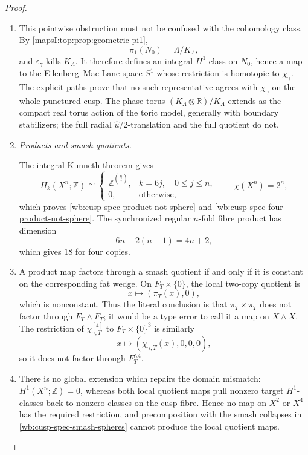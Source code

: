 \begin{proof}
\begin{enumerate}[label=\arabic*.,leftmargin=*]
\item This pointwise obstruction must not be confused with the cohomology class.
By \cref{mapsI:top:prop:geometric-pi1},
\[
 \pi_1(N_0)=\Lambda/K_\Lambda,
\]
and \(\varepsilon_\gamma\) kills \(K_\Lambda\).  It therefore defines an
integral \(H^1\)-class on \(N_0\), hence a map to the Eilenberg--Mac Lane
space \(S^1\) whose restriction is homotopic to \(\chi_\gamma\).  The
explicit paths prove that no such representative agrees with
\(\chi_\gamma\) on the whole punctured cusp.  The phase torus
\((K_\Lambda\otimes\mathbb R)/K_\Lambda\) extends as the compact real torus
action of the toric model, generally with boundary stabilizers; the full
radial \(\widehat u/2\)-translation and the full quotient do not.

\item \medskip\noindent\emph{Products and smash quotients.}\par
The integral Kunneth theorem gives
\[
 H_k(X^n;\mathbb Z)\cong
 \begin{cases}
  \mathbb Z^{\binom nj},&k=6j,\quad0\le j\le n,\\
  0,&\text{otherwise},
 \end{cases}
 \qquad \chi(X^n)=2^n,
\]
which proves
\cref{wb:cusp-spec-product-not-sphere} and \cref{wb:cusp-spec-four-product-not-sphere}.
The synchronized regular \(n\)-fold fibre product has dimension
\[
 6n-2(n-1)=4n+2,
\]
which gives \(18\) for four copies.

\item A product map factors through a smash quotient if and only if it is
constant on the corresponding fat wedge.  On
\(F_T\times\{0\}\), the local two-copy quotient is
\[
 x\longmapsto(\pi_T(x),0),
\]
which is nonconstant.  Thus the literal conclusion is that
\(\pi_T\times\pi_T\) does not factor through \(F_T\wedge F_T\); it would
be a type error to call it a map on \(X\wedge X\).  The restriction of
\(\chi_{\gamma,T}^{[4]}\) to \(F_T\times\{0\}^3\) is similarly
\[
 x\longmapsto(\chi_{\gamma,T}(x),0,0,0),
\]
so it does not factor through \(F_T^{\wedge4}\).

\item There is no global extension which repairs the domain mismatch:
\(H^1(X^n;\mathbb Z)=0\), whereas both local quotient maps pull nonzero
target \(H^1\)-classes back to nonzero classes on the cusp fibre.  Hence no
map on \(X^2\) or \(X^4\) has the required restriction, and precomposition
with the smash collapses in \cref{wb:cusp-spec-smash-spheres} cannot produce
the local quotient maps.


\end{enumerate}
\end{proof}
